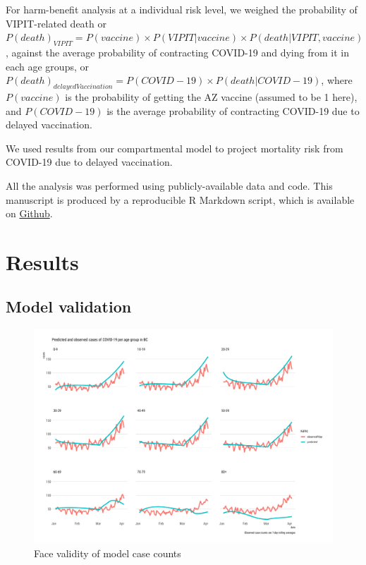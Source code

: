 \documentclass[]{interact}
\theoremstyle{plain}%
\theoremstyle{definition}
\theoremstyle{remark}
\begin{document}
For harm-benefit analysis at a individual risk level, we weighed the
probability of VIPIT-related death or
\(P(death)_{VIPIT} = P(vaccine) \times P(VIPIT|vaccine) \times P(death|VIPIT, vaccine)\),
against the average probability of contracting COVID-19 and dying from
it in each age groups, or
\(P(death)_{delayedVaccination} = P(COVID-19) \times P(death|COVID-19)\),
where \(P(vaccine)\) is the probability of getting the AZ vaccine
(assumed to be 1 here), and \(P(COVID-19)\) is the average probability
of contracting COVID-19 due to delayed vaccination.

We used results from our compartmental model to project mortality risk
from COVID-19 due to delayed vaccination.

All the analysis was performed using publicly-available data and code.
This manuscript is produced by a reproducible R Markdown script, which
is available on
\href{https://github.com/aminadibi/astrazenecaVIPIT}{Github}.

\hypertarget{results}{%
\section{Results}\label{results}}

\hypertarget{model-validation}{%
\subsection{Model validation}\label{model-validation}}

\begin{figure}

{\centering \includegraphics[width=1\linewidth]{../figures/fig-validation} 

}

\caption{Face validity of model case counts}\label{fig:figValidation}
\end{figure}
\end{document}
